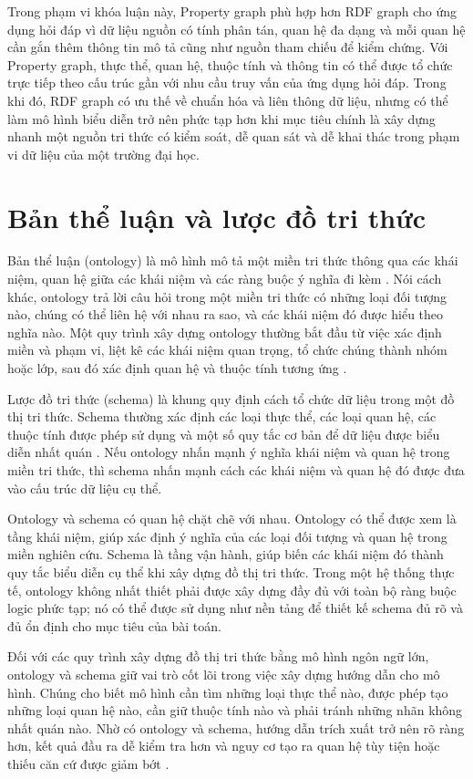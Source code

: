 Trong phạm vi khóa luận này, Property graph phù hợp hơn RDF graph cho ứng dụng hỏi đáp vì dữ liệu nguồn có tính phân tán, quan hệ đa dạng và mỗi quan hệ cần gắn thêm thông tin mô tả cũng như nguồn tham chiếu để kiểm chứng. Với Property graph, thực thể, quan hệ, thuộc tính và thông tin có thể được tổ chức trực tiếp theo cấu trúc gần với nhu cầu truy vấn của ứng dụng hỏi đáp. Trong khi đó, RDF graph có ưu thế về chuẩn hóa và liên thông dữ liệu, nhưng có thể làm mô hình biểu diễn trở nên phức tạp hơn khi mục tiêu chính là xây dựng nhanh một nguồn tri thức có kiểm soát, dễ quan sát và dễ khai thác trong phạm vi dữ liệu của một trường đại học.

\section{Bản thể luận và lược đồ tri thức}

Bản thể luận (ontology) là mô hình mô tả một miền tri thức thông qua các khái niệm, quan hệ giữa các khái niệm và các ràng buộc ý nghĩa đi kèm \cite{gruber1993translation}. Nói cách khác, ontology trả lời câu hỏi trong một miền tri thức có những loại đối tượng nào, chúng có thể liên hệ với nhau ra sao, và các khái niệm đó được hiểu theo nghĩa nào. Một quy trình xây dựng ontology thường bắt đầu từ việc xác định miền và phạm vi, liệt kê các khái niệm quan trọng, tổ chức chúng thành nhóm hoặc lớp, sau đó xác định quan hệ và thuộc tính tương ứng \cite{noy2001ontology}.

Lược đồ tri thức (schema) là khung quy định cách tổ chức dữ liệu trong một đồ thị tri thức. Schema thường xác định các loại thực thể, các loại quan hệ, các thuộc tính được phép sử dụng và một số quy tắc cơ bản để dữ liệu được biểu diễn nhất quán \cite{hogan2021knowledge}. Nếu ontology nhấn mạnh ý nghĩa khái niệm và quan hệ trong miền tri thức, thì schema nhấn mạnh cách các khái niệm và quan hệ đó được đưa vào cấu trúc dữ liệu cụ thể.

Ontology và schema có quan hệ chặt chẽ với nhau. Ontology có thể được xem là tầng khái niệm, giúp xác định ý nghĩa của các loại đối tượng và quan hệ trong miền nghiên cứu. Schema là tầng vận hành, giúp biến các khái niệm đó thành quy tắc biểu diễn cụ thể khi xây dựng đồ thị tri thức. Trong một hệ thống thực tế, ontology không nhất thiết phải được xây dựng đầy đủ với toàn bộ ràng buộc logic phức tạp; nó có thể được sử dụng như nền tảng để thiết kế schema đủ rõ và đủ ổn định cho mục tiêu của bài toán.

Đối với các quy trình xây dựng đồ thị tri thức bằng mô hình ngôn ngữ lớn, ontology và schema giữ vai trò cốt lõi trong việc xây dựng hướng dẫn cho mô hình. Chúng cho biết mô hình cần tìm những loại thực thể nào, được phép tạo những loại quan hệ nào, cần giữ thuộc tính nào và phải tránh những nhãn không nhất quán nào. Nhờ có ontology và schema, hướng dẫn trích xuất trở nên rõ ràng hơn, kết quả đầu ra dễ kiểm tra hơn và nguy cơ tạo ra quan hệ tùy tiện hoặc thiếu căn cứ được giảm bớt \cite{pan2024unifying}.

